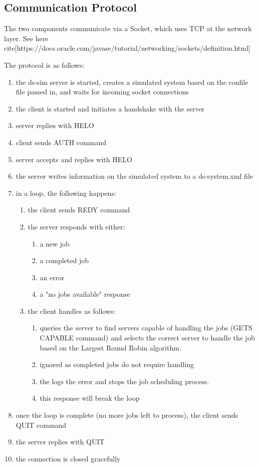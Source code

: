\documentclass[a4paper]{article}
\begin{document}
\subsection{Communication Protocol}
The two components communicate via a Socket, which uses TCP at the network layer. See here \TODO cite[https://docs.oracle.com/javase/tutorial/networking/sockets/definition.html]

The protocol is as follows:
\begin{enumerate}
  \item the ds-sim server is started, creates a simulated system based on the confile file passed in, and waits for incoming socket connections
  \item the client is started and initiates a handshake with the server
  \item server replies with HELO
  \item client sends AUTH command
  \item server accepts and replies with HELO
  \item the server writes information on the simulated system to a ds-system.xml file
  \item in a loop, the following happens:
  \begin{enumerate}
      \item the client sends REDY command
      \item the server responds with either:
      \begin{enumerate}
          \item a new job
          \item a completed job
          \item an error
          \item a "no jobs available" response
      \end{enumerate}
      \item the client handles as follows:
      \begin{enumerate}
          \item queries the server to find servers capable of handling the jobs (GETS CAPABLE command) and selects the correct server to handle the job based on the Largest Round Robin algorithm.
          \item ignored as completed jobs do not require handling
          \item the logs the error and stops the job scheduling process.
          \item this response will break the loop
      \end{enumerate}
  \end{enumerate}
  \item once the loop is complete (no more jobs left to process), the client sends QUIT command
  \item the server replies with QUIT
  \item the connection is closed gracefully
\end{enumerate}
\end{document}
